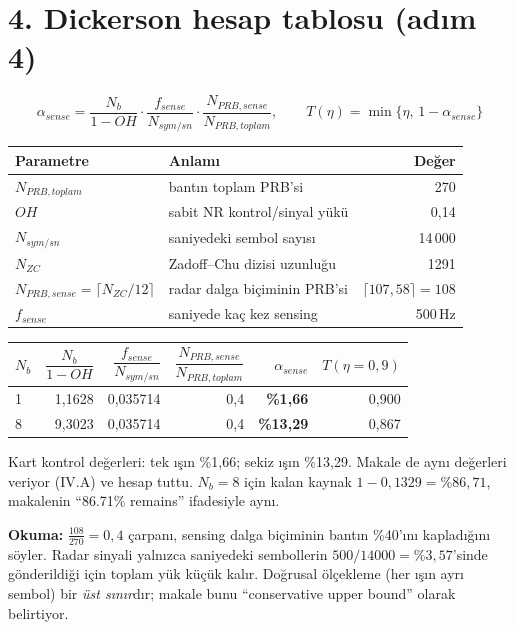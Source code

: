 \documentclass[10.5pt,a4paper]{article}
\begin{document}
\section*{4. Dickerson hesap tablosu (adım 4)}
$$\alpha_{sense}=\frac{N_b}{1-OH}\cdot\frac{f_{sense}}{N_{sym/sn}}\cdot\frac{N_{PRB,sense}}{N_{PRB,toplam}},\qquad T(\eta)=\min\{\eta,\,1-\alpha_{sense}\}$$

\begin{center}\sffamily\small
\begin{tabular}{@{}llr@{}}
\toprule
\textbf{Parametre} & \textbf{Anlamı} & \textbf{Değer} \\
\midrule
$N_{PRB,toplam}$ & bantın toplam PRB'si & 270 \\
$OH$ & sabit NR kontrol/sinyal yükü & 0,14 \\
$N_{sym/sn}$ & saniyedeki sembol sayısı & 14\,000 \\
$N_{ZC}$ & Zadoff--Chu dizisi uzunluğu & 1291 \\
$N_{PRB,sense}=\lceil N_{ZC}/12\rceil$ & radar dalga biçiminin PRB'si & $\lceil 107{,}58\rceil=108$ \\
$f_{sense}$ & saniyede kaç kez sensing & 500\,Hz \\
\bottomrule
\end{tabular}
\end{center}

\begin{center}\sffamily\small
\begin{tabular}{@{}lrrrrr@{}}
\toprule
$N_b$ & $\dfrac{N_b}{1-OH}$ & $\dfrac{f_{sense}}{N_{sym/sn}}$ & $\dfrac{N_{PRB,sense}}{N_{PRB,toplam}}$ & $\alpha_{sense}$ & $T(\eta{=}0{,}9)$ \\
\midrule
1 & 1,1628 & 0,035714 & 0,4 & \textbf{\%1,66} & 0,900 \\
8 & 9,3023 & 0,035714 & 0,4 & \textbf{\%13,29} & 0,867 \\
\bottomrule
\end{tabular}
\end{center}

\begin{kontrol}
Kart kontrol değerleri: tek ışın \%1,66; sekiz ışın \%13,29. Makale de aynı değerleri veriyor (IV.A) ve hesap tuttu. $N_b=8$ için kalan kaynak $1-0{,}1329=\%86{,}71$, makalenin ``86.71\% remains'' ifadesiyle aynı.
\end{kontrol}

\textbf{Okuma:} $\tfrac{108}{270}=0{,}4$ çarpanı, sensing dalga biçiminin bantın \%40'ını kapladığını söyler. Radar sinyali yalnızca saniyedeki sembollerin $500/14000=\%3{,}57$'sinde gönderildiği için toplam yük küçük kalır. Doğrusal ölçekleme (her ışın ayrı sembol) bir \emph{üst sınır}dır; makale bunu ``conservative upper bound'' olarak belirtiyor.
\end{document}
